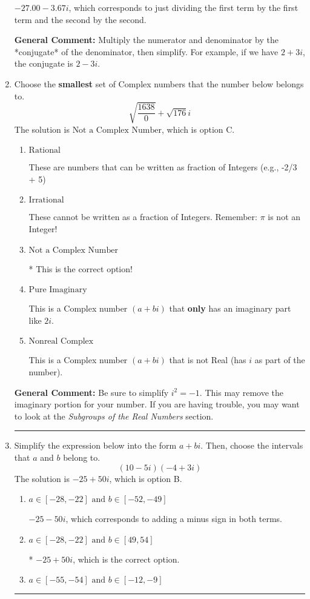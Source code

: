 \documentclass{extbook}[14pt]
\newcommand{\litem}[1]{\item #1

\rule{\textwidth}{0.4pt}}
\begin{document}
\begin{enumerate}
{\begin{enumerate}[label=\Alph*.]
 $-27.00  - 3.67 i$, which corresponds to just dividing the first term by the first term and the second by the second.
\end{enumerate}

\textbf{General Comment:} Multiply the numerator and denominator by the *conjugate* of the denominator, then simplify. For example, if we have $2+3i$, the conjugate is $2-3i$.
}
\litem{
Choose the \textbf{smallest} set of Complex numbers that the number below belongs to.
\[ \sqrt{\frac{1638}{0}}+\sqrt{176} i \]
The solution is \( \text{Not a Complex Number} \), which is option C.\begin{enumerate}[label=\Alph*.]
\item \( \text{Rational} \)

These are numbers that can be written as fraction of Integers (e.g., -2/3 + 5)
\item \( \text{Irrational} \)

These cannot be written as a fraction of Integers. Remember: $\pi$ is not an Integer!
\item \( \text{Not a Complex Number} \)

* This is the correct option!
\item \( \text{Pure Imaginary} \)

This is a Complex number $(a+bi)$ that \textbf{only} has an imaginary part like $2i$.
\item \( \text{Nonreal Complex} \)

This is a Complex number $(a+bi)$ that is not Real (has $i$ as part of the number).
\end{enumerate}

\textbf{General Comment:} Be sure to simplify $i^2 = -1$. This may remove the imaginary portion for your number. If you are having trouble, you may want to look at the \textit{Subgroups of the Real Numbers} section.
}
\litem{
Simplify the expression below into the form $a+bi$. Then, choose the intervals that $a$ and $b$ belong to.
\[ (10 - 5 i)(-4 + 3 i) \]
The solution is \( -25 + 50 i \), which is option B.\begin{enumerate}[label=\Alph*.]
\item \( a \in [-28, -22] \text{ and } b \in [-52, -49] \)

 $-25 - 50 i$, which corresponds to adding a minus sign in both terms.
\item \( a \in [-28, -22] \text{ and } b \in [49, 54] \)

* $-25 + 50 i$, which is the correct option.
\item \( a \in [-55, -54] \text{ and } b \in [-12, -9] \)


\end{enumerate}}
\end{enumerate}
\end{document}
